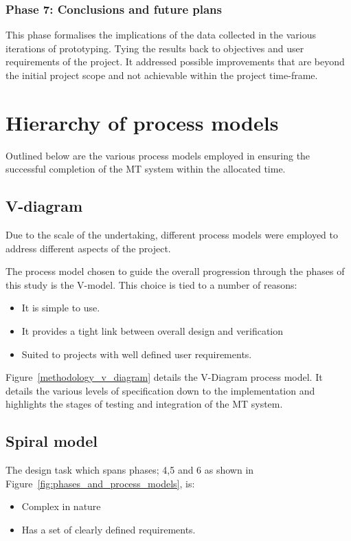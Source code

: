 \subsubsection{Phase 7: Conclusions and future plans}
This phase formalises the implications of the data collected in the various
iterations of prototyping. Tying the results back to objectives and user
requirements of the project.
It addressed possible improvements that are beyond the initial project scope
and not achievable within the project time-frame.

\section{Hierarchy of process models}
Outlined below are the various process models employed in ensuring the
successful completion of the MT system within the allocated time.

\subsection{V-diagram}
Due to the scale of the undertaking, different process models were employed to
address different aspects of the project.

The process model chosen to guide the overall progression through the phases of
this study is the V-model. This choice is tied to a number of reasons: 
\begin{itemize}
    \item It is simple to use.
    \item It provides a tight link between overall design and verification 
    \item Suited to projects with well defined user requirements.
\end{itemize}

Figure~\ref{methodology_v_diagram} details the V-Diagram process model. It
details the various levels of specification down to the implementation and
highlights the stages of testing and integration of the MT system.



\subsection{Spiral model}
The design task which spans phases; 4,5 and 6 as shown in Figure~\ref{fig:phases_and_process_models}, is: 
\begin{itemize}
    \item Complex in nature
    \item Has a set of clearly defined requirements. 
\end{itemize}

